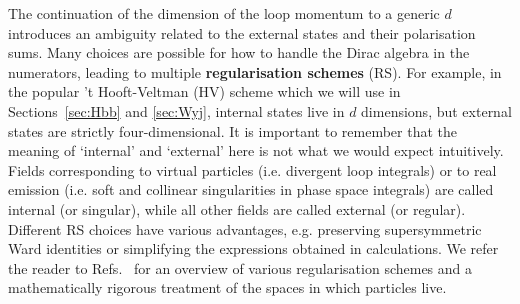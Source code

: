 \documentclass[main.tex]{subfiles}
\begin{document}
The continuation of the dimension of the loop momentum to a generic $d$ introduces an ambiguity related to the external states and their polarisation sums. Many choices are possible for how to handle the Dirac algebra in the numerators, leading to multiple \textbf{regularisation schemes} (RS). For example, in the popular ’t Hooft-Veltman (HV) scheme which we will use in Sections~\ref{sec:Hbb} and \ref{sec:Wyj}, internal states live in $d$ dimensions, but external states are strictly four-dimensional. It is important to remember that the meaning of `internal' and `external' here is not what we would expect intuitively. Fields corresponding to virtual particles (i.e. divergent loop integrals) or to real emission (i.e. soft and collinear singularities in phase space integrals) are called internal (or singular), while all other fields are called external (or regular). Different RS choices have various advantages, e.g. preserving supersymmetric Ward identities or simplifying the expressions obtained in calculations. We refer the reader to Refs.~\cite{Signer:2008va, Gnendiger:2017pys} for an overview of various regularisation schemes and a mathematically rigorous treatment of the spaces in which particles live.

%
\end{document}
